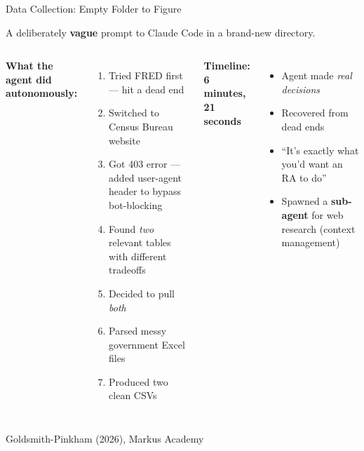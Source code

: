 \documentclass[aspectratio=169, 11pt]{beamer}
\newcommand{\emphgold}[1]{\alert{\textbf{#1}}}
\newcommand{\sourceref}[1]{\vspace{0.15cm}\hfill{\tiny\textcolor{medgray}{#1}}}
\begin{document}
\begin{frame}[shrink=16]{Data Collection: Empty Folder to Figure}
\begin{keyinsight}
A deliberately \emphgold{vague} prompt to Claude Code in a brand-new directory.
\end{keyinsight}
\vspace{0.3cm}
\begin{columns}[T]
\textbf{What the agent did autonomously:}
\begin{enumerate}
  \item Tried FRED first --- hit a dead end
  \item Switched to Census Bureau website
  \item Got 403 error --- added user-agent header to bypass bot-blocking
  \item Found \emph{two} relevant tables with different tradeoffs
  \item Decided to pull \emph{both}
  \item Parsed messy government Excel files
  \item Produced two clean CSVs
\end{enumerate}

\vspace{0.3cm}
\begin{center}
\textbf{Timeline:} \emphgold{6 minutes, 21 seconds}
\end{center}
\vspace{0.3cm}
\begin{itemize}
  \item Agent made \emph{real decisions}
  \item Recovered from dead ends
  \item ``It's exactly what you'd want an RA to do''
  \item Spawned a \textbf{sub-agent} for web research (context management)
\end{itemize}
\end{columns}
\sourceref{Goldsmith-Pinkham (2026), Markus Academy}
\end{frame}
\end{document}
